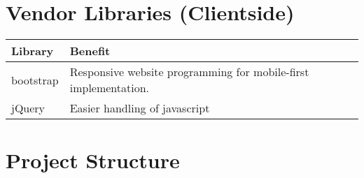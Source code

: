 \documentclass[10pt,a4paper,landscape]{article}
\begin{document}
\section{Vendor Libraries (Clientside)}
\begin{tabularx}{\textwidth}{ll}
    \textbf{Library}& \textbf{Benefit}       \\
    \toprule
    bootstrap       & Responsive website programming for mobile-first implementation.\\
    \midrule
    jQuery          & Easier handling of javascript \\
    \bottomrule
\end{tabularx}
    
\section{Project Structure}
\end{document}
